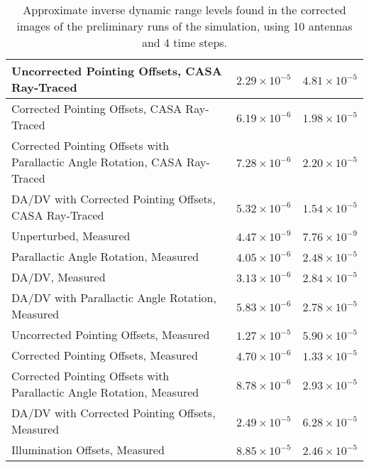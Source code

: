 \documentclass[11pt]{article}
\begin{document}
\begin{table}
\begin{tabular}{|p{8cm}|c|c|}
    \hline
    Uncorrected Pointing Offsets, CASA Ray-Traced & $2.29 \times 10^{-5}$ &
    $4.81 \times 10^{-5}$ \\
    \hline
    Corrected Pointing Offsets, CASA Ray-Traced & $6.19 \times 10^{-6}$ &
    $1.98 \times 10^{-5}$ \\
    \hline
    Corrected Pointing Offsets with Parallactic Angle Rotation, CASA
    Ray-Traced & $7.28 \times 10^{-6}$ & $2.20 \times 10^{-5}$ \\
    \hline
    DA/DV with Corrected Pointing Offsets, CASA Ray-Traced & $5.32 \times
    10^{-6}$ & $1.54 \times 10^{-5}$ \\
    \hline
    Unperturbed, Measured & $4.47 \times 10^{-9}$ & $7.76 \times
    10^{-9}$ \\
    \hline
    Parallactic Angle Rotation, Measured & $4.05 \times 10^{-6}$ &
    $2.48 \times 10^{-5}$\\
    \hline
    DA/DV, Measured & $3.13 \times 10^{-6}$ & $2.84 \times 10^{-5}$ \\
    \hline
    DA/DV with Parallactic Angle Rotation, Measured & $5.83 \times
    10^{-6}$ & $2.78 \times 10^{-5}$ \\
    \hline
    Uncorrected Pointing Offsets, Measured & $1.27 \times 10^{-5}$
    & $5.90 \times 10^{-5}$ \\
    \hline
    Corrected Pointing Offsets, Measured & $4.70 \times 10^{-6}$ &
    $1.33 \times 10^{-5}$\\
    \hline
    Corrected Pointing Offsets with Parallactic Angle Rotation, Measured & 
    $8.78 \times 10^{-6}$ & $2.93 \times 10^{-5}$ \\
    \hline
    DA/DV with Corrected Pointing Offsets, Measured & $2.49 \times
    10^{-5}$ & $6.28 \times 10^{-5}$ \\
    \hline
    Illumination Offsets, Measured & $8.85 \times
    10^{-5}$ & $2.46 \times 10^{-5}$ \\
    \hline
    \end{tabular}
    \caption{
        Approximate inverse dynamic range levels found in the corrected images 
        of the preliminary runs of the simulation, using 10 antennas and 4 time 
        steps.
    }
    \label{tab:rms-10ants}
\end{table}
\end{document}
